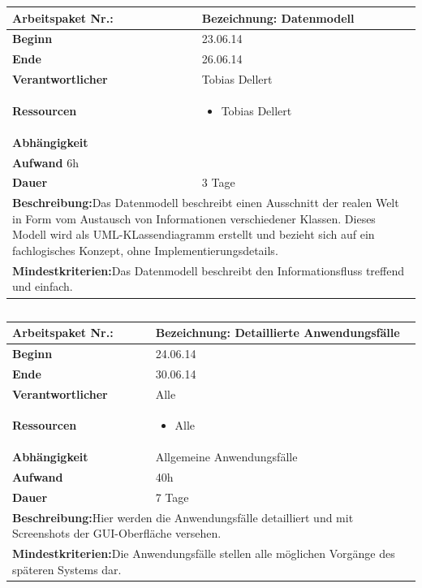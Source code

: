 \documentclass[fontsize=12pt,paper=a4,twoside]{scrartcl}
\begin{document}
	\begin{tabular}{|p{5.3cm}|p{9.7cm}|}\hline
		\textbf{Arbeitspaket Nr.:}  & \textbf{Bezeichnung:} Datenmodell\\ \hline \hline
		\textbf{Beginn} & 23.06.14\\ \hline
		\textbf{Ende} & 26.06.14\\ \hline
		\textbf{Verantwortlicher} & Tobias Dellert\\ \hline
		\textbf{Ressourcen} & \begin{itemize}
			\item Tobias Dellert
		\end{itemize}    \\ \hline
		\textbf{Abhängigkeit} &\\ \hline
		\textbf{Aufwand} 6h & \\ \hline
		\textbf{Dauer} & 3 Tage\\ \hline
		\multicolumn{2}{|p{15cm}|}{\textbf{Beschreibung:}\newline Das Datenmodell beschreibt einen Ausschnitt der realen Welt in Form vom Austausch von Informationen verschiedener Klassen. Dieses Modell wird als UML-KLassendiagramm erstellt und bezieht sich auf ein fachlogisches Konzept, ohne Implementierungsdetails. }\\ \hline
		\multicolumn{2}{|p{15cm}|}{\textbf{Mindestkriterien:}\newline Das Datenmodell beschreibt den Informationsfluss treffend und einfach. }\\ \hline
	\end{tabular}
	
	\begin{verbatim} 
	\end{verbatim}
	
	\begin{tabular}{|p{5.3cm}|p{9.7cm}|}\hline
		\textbf{Arbeitspaket Nr.:}  & \textbf{Bezeichnung:} Detaillierte Anwendungsfälle\\ \hline \hline
		\textbf{Beginn} & 24.06.14\\ \hline
		\textbf{Ende} & 30.06.14\\ \hline
		\textbf{Verantwortlicher} & Alle\\ \hline
		\textbf{Ressourcen} & \begin{itemize}
			\item Alle
		\end{itemize}    \\ \hline
		\textbf{Abhängigkeit} & Allgemeine Anwendungsfälle\\ \hline
		\textbf{Aufwand} & 40h\\ \hline
		\textbf{Dauer} & 7 Tage\\ \hline
		\multicolumn{2}{|p{15cm}|}{\textbf{Beschreibung:}\newline Hier werden die Anwendungsfälle detailliert und mit Screenshots der GUI-Oberfläche versehen. }\\ \hline
		\multicolumn{2}{|p{15cm}|}{\textbf{Mindestkriterien:}\newline Die Anwendungsfälle stellen alle möglichen Vorgänge des späteren Systems dar. }\\ \hline
	\end{tabular}
	
\end{document}
